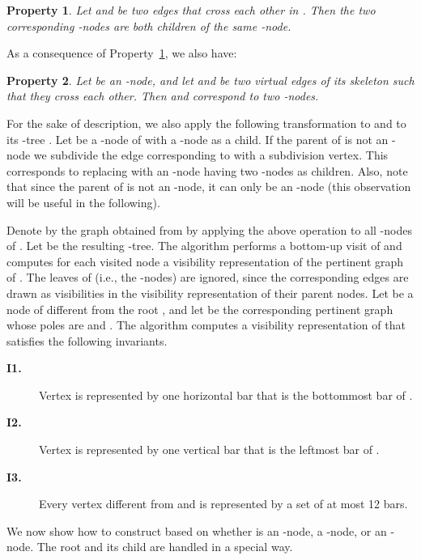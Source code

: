 \documentclass{article}
\newtheorem{property}{Property}
\begin{document}
\begin{property}\label{pr:crossings-in-rnodes}
Let  and  be two edges that cross each other in . Then the two corresponding -nodes are both children of the same -node.
\end{property}

As a consequence of Property~\ref{pr:crossings-in-rnodes}, we also have:

\begin{property}\label{pr:virtualedges}
Let  be an -node, and let  and  be two virtual edges of its skeleton  such that they cross each other. Then  and  correspond to two -nodes.
\end{property}

For the sake of description, we also apply the following transformation to  and to its -tree . Let  be a -node of  with a -node  as a child. If the parent of  is not an -node we subdivide the edge  corresponding to  with a subdivision vertex. This corresponds to replacing  with an -node having two -nodes as children. Also, note that since the parent of  is not an -node, it can only be an -node (this observation will be useful in the following).

Denote by  the graph obtained from  by applying the above operation to all -nodes of . Let  be the resulting -tree.  The algorithm performs a bottom-up visit of  and computes for each visited node  a visibility representation of the pertinent graph  of . The leaves of  (i.e.,  the -nodes) are ignored, since the corresponding edges are drawn as visibilities in the visibility representation of their parent nodes. Let  be a node of  different from the root , and let  be the corresponding pertinent graph whose poles are  and . The algorithm computes a visibility representation  of  that satisfies the following invariants.


\begin{description}
\item[\bf I1.] Vertex  is represented by one horizontal bar that is the bottommost bar of .

\item[\bf I2.] Vertex  is represented by one vertical bar that is the leftmost bar of .

\item[\bf I3.] Every vertex different from  and  is represented by a set of at most 12 bars.
\end{description}


We now show how to construct  based on whether  is an -node, a -node, or an -node. The root  and its child  are handled in a special way.
\end{document}
